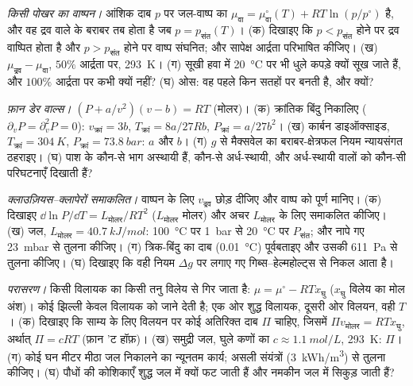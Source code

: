 \begin{exercise}[$\star\star$]\label{exo:b2:thermodynamic-potentials:8}
\emph{किसी पोखर का वाष्पन।} आंशिक दाब $p$ पर जल-वाष्प का 
$\mu_{\text{वा}} = \mu_{\text{वा}}^\circ(T) +
RT\ln(p/p^\circ)$ है, और वह द्रव वाले के बराबर तब होता है जब $p = p_{\text{संत}}(T)$।
(क) दिखाइए कि $p < p_{\text{संत}}$ होने पर द्रव वाष्पित होता है और
$p > p_{\text{संत}}$ होने पर वाष्प संघनित; और सापेक्ष आर्द्रता परिभाषित कीजिए। (ख)
$\mu_{\text{द्रव}} - \mu_{\text{वा}}$, $50\%$ आर्द्रता पर, \qty{293}{K}। (ग) सूखी हवा में
\qty{20}{\celsius} पर भी धुले कपड़े क्यों सूख जाते हैं, और $100\%$ आर्द्रता पर कभी क्यों नहीं?
(घ) ओस: वह पहले किन सतहों पर बनती है, और क्यों?
\end{exercise}

\begin{exercise}[$\star\star$]\label{exo:b2:thermodynamic-potentials:9}
\emph{फ़ान डेर वाल्स।} $(P + a/v^2)(v - b) = RT$ (मोलर)। (क) क्रांतिक
बिंदु निकालिए ($\partial_vP = \partial_v^2P = 0$): $v_{\text{क्रां}} = 3b$,
$T_{\text{क्रां}} = 8a/27Rb$, $P_{\text{क्रां}} = a/27b^2$। (ख) कार्बन डाइऑक्साइड,
$T_{\text{क्रां}} = \qty{304}{K}$, $P_{\text{क्रां}} = \qty{73.8}{bar}$: $a$ और $b$। (ग)
$g$ से मैक्सवेल का बराबर-क्षेत्रफल नियम न्यायसंगत ठहराइए। (घ) पाश के कौन-से भाग
अस्थायी हैं, कौन-से अर्ध-स्थायी, और अर्ध-स्थायी वालों को कौन-सी परिघटनाएँ
दिखाती हैं?
\end{exercise}

\begin{exercise}[$\star\star\star$]\label{exo:b2:thermodynamic-potentials:10}
\emph{क्लाउज़ियस--क्लापेरों समाकलित।} वाष्पन के लिए $v_{\text{द्रव}}$ छोड़ दीजिए
और वाष्प को पूर्ण मानिए। (क) दिखाइए $\dd\ln P/\dd T = L_{\text{मोलर}}/RT^2$
($L_{\text{मोलर}}$ मोलर) और अचर $L_{\text{मोलर}}$ के लिए समाकलित कीजिए। (ख) जल,
$L_{\text{मोलर}} = \qty{40.7}{kJ/mol}$: \qty{100}{\celsius} पर \qty{1}{bar} से
\qty{20}{\celsius} पर $P_{\text{संत}}$; और नापे गए \qty{23}{mbar} से तुलना कीजिए।
(ग) त्रिक-बिंदु का दाब (\qty{0.01}{\celsius}) पूर्वबताइए और उसकी
\qty{611}{Pa} से तुलना कीजिए। (घ) दिखाइए कि वही नियम $\Delta g$ पर लगाए गए
गिब्स--हेल्महोल्ट्स से निकल आता है।
\end{exercise}

\begin{exercise}[$\star\star\star$]\label{exo:b2:thermodynamic-potentials:11}
\emph{परासरण।} किसी विलायक का  किसी तनु
विलेय से गिर जाता है: $\mu = \mu^\circ - RTx_{\text{घु}}$ ($x_{\text{घु}}$ विलेय का मोल
अंश)। कोई झिल्ली केवल विलायक को जाने देती है; एक ओर शुद्ध विलायक,
दूसरी ओर विलयन, वही $T$। (क) दिखाइए कि साम्य के लिए
विलयन पर कोई अतिरिक्त दाब $\Pi$ चाहिए, जिसमें $\Pi v_{\text{मोलर}} =
RTx_{\text{घु}}$, अर्थात् $\Pi = cRT$ (फ़ान 'ट हॉफ़)। (ख) समुद्री जल, घुले कणों का $c \approx
\qty{1.1}{mol/L}$, \qty{293}{K}: $\Pi$। (ग) कोई घन मीटर मीठा जल निकालने का
न्यूनतम कार्य; असली संयंत्रों (\qty{3}{kWh/m^3}) से तुलना कीजिए। (घ) पौधों की
कोशिकाएँ शुद्ध जल में क्यों फट जाती हैं और नमकीन जल में सिकुड़ जाती हैं?
\end{exercise}

